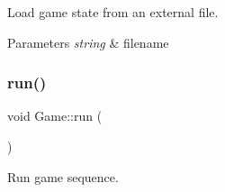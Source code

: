 Load game state from an external file. 


\begin{DoxyParams}{Parameters}
{\em string} & filename \\
\hline
\end{DoxyParams}
\mbox{\label{class_game_a1ab78f5ed0d5ea879157357cf2fb2afa}} 
\subsubsection{\texorpdfstring{run()}{run()}}
{\footnotesize\ttfamily void Game\+::run (\begin{DoxyParamCaption}{ }\end{DoxyParamCaption})}



Run game sequence. 

